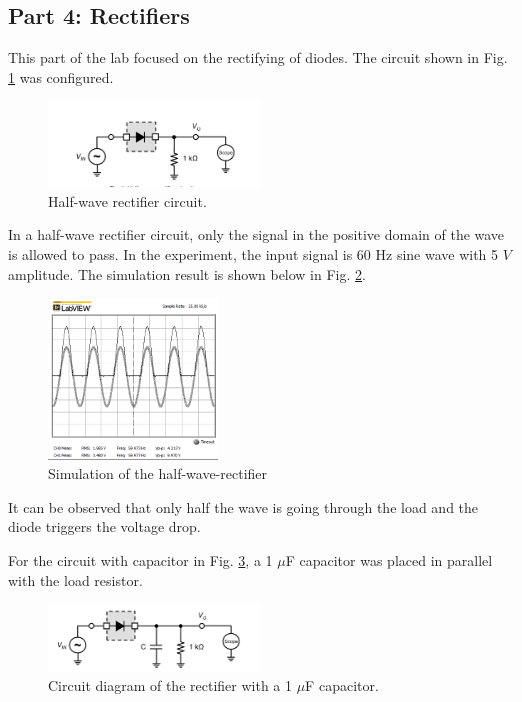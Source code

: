 \documentclass[letterpaper, 10 pt, conference]{ieeeconf}  %
\begin{document}
\subsection{Part 4: Rectifiers}
This part of the lab focused on the rectifying of diodes. The circuit
shown in Fig. \ref{fig:rectifier_1} was configured.
\begin{figure}[ht]
  \centering
  \includegraphics[width=0.5\textwidth]{images/rectifier_circuit.png}
  \caption{Half-wave rectifier circuit.}
  \label{fig:rectifier_1}
\end{figure}
\par In a half-wave rectifier circuit, only the signal in the positive domain of
the wave is allowed to pass. In the experiment, the input signal is 60 Hz sine wave
with 5 $V$ amplitude. The simulation result is shown below in Fig. \ref{fig:rectifier_2}.
\begin{figure}[h]
  \centering
  \includegraphics[width=0.4\textwidth]{images/halfwave.png}
  \caption{Simulation of the half-wave-rectifier}
  \label{fig:rectifier_2}
\end{figure}
\par It can be observed that only half the wave is going through the load and the diode
triggers the voltage drop.
\newpage
\par For the circuit with capacitor in Fig. \ref{fig:rectifier_3}, a 1 $\mu$F
capacitor was placed in parallel with the load resistor.
\begin{figure}[h]
  \centering
  \includegraphics[width=0.5\textwidth]{images/rectifier_circuit_2.png}
  \caption{Circuit diagram of the rectifier with a 1 $\mu$F capacitor.}
  \label{fig:rectifier_3}
\end{figure}
\end{document}
